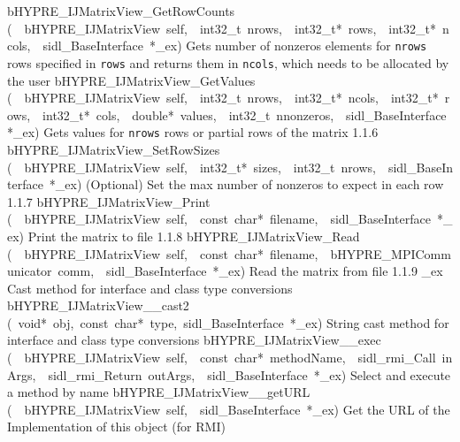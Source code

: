 \documentclass{article}
\begin{document}
\begin{cxxentry}
\begin{cxxentry}
\begin{cxxnames}
        {bHYPRE\_IJMatrixView\_GetRowCounts}
        {(\ \ bHYPRE\_IJMatrixView\ self,\ \ int32\_t\ nrows,\ \ int32\_t*\ rows,\ \ int32\_t*\ ncols,\ \ sidl\_BaseInterface\ *\_ex)}
        {
Gets number of nonzeros elements for {\tt nrows} rows
specified in {\tt rows} and returns them in {\tt ncols},
which needs to be allocated by the user}
        {}
\label{cxx.1.1.12}
        {bHYPRE\_IJMatrixView\_GetValues}
        {(\ \ bHYPRE\_IJMatrixView\ self,\ \ int32\_t\ nrows,\ \ int32\_t*\ ncols,\ \ int32\_t*\ rows,\ \ int32\_t*\ cols,\ \ double*\ values,\ \ int32\_t\ nnonzeros,\ \ sidl\_BaseInterface\ *\_ex)}
        {
Gets values for {\tt nrows} rows or partial rows of the
matrix}
        {1.1.6}
        {bHYPRE\_IJMatrixView\_SetRowSizes}
        {(\ \ bHYPRE\_IJMatrixView\ self,\ \ int32\_t*\ sizes,\ \ int32\_t\ nrows,\ \ sidl\_BaseInterface\ *\_ex)}
        {
(Optional) Set the max number of nonzeros to expect in each
row}
        {1.1.7}
        {bHYPRE\_IJMatrixView\_Print}
        {(\ \ bHYPRE\_IJMatrixView\ self,\ \ const\ char*\ filename,\ \ sidl\_BaseInterface\ *\_ex)}
        {
Print the matrix to file}
        {1.1.8}
        {bHYPRE\_IJMatrixView\_Read}
        {(\ \ bHYPRE\_IJMatrixView\ self,\ \ const\ char*\ filename,\ \ bHYPRE\_MPICommunicator\ comm,\ \ sidl\_BaseInterface\ *\_ex)}
        {
Read the matrix from file}
        {1.1.9}
        {\_ex}
        {}
        {
Cast method for interface and class type conversions}
        {}
\label{cxx.1.1.13}
        {bHYPRE\_IJMatrixView\_\_cast2}
        {(\ void*\ obj,\ const\ char*\ type,\ sidl\_BaseInterface\ *\_ex)}
        {
String cast method for interface and class type conversions}
        {}
\label{cxx.1.1.14}
        {bHYPRE\_IJMatrixView\_\_exec}
        {(\ \ bHYPRE\_IJMatrixView\ self,\ \ const\ char*\ methodName,\ \ sidl\_rmi\_Call\ inArgs,\ \ sidl\_rmi\_Return\ outArgs,\ \ sidl\_BaseInterface\ *\_ex)}
        {
Select and execute a method by name}
        {}
\label{cxx.1.1.15}
        {bHYPRE\_IJMatrixView\_\_getURL}
        {(\ \ bHYPRE\_IJMatrixView\ self,\ \ sidl\_BaseInterface\ *\_ex)}
        {
Get the URL of the Implementation of this object (for RMI)}
        {}
\label{cxx.1.1.16}

\end{cxxnames}
\end{cxxentry}
\end{cxxentry}
\end{document}
